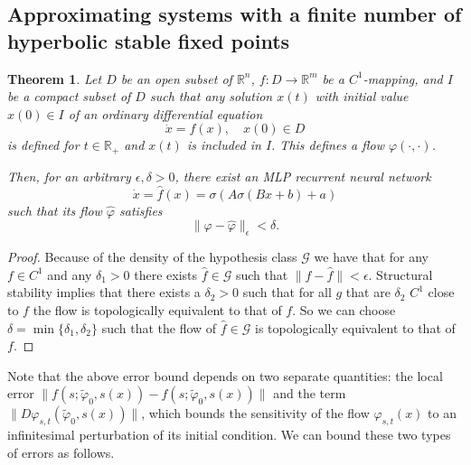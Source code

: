 \documentclass{article}
\newtheorem{theorem}{Theorem}
\theoremstyle{definition}
\theoremstyle{remark}
\newcommand{\reals}{\mathbb{R}}
\newcounter{ct}
\begin{document}
\subsection{Approximating systems with a finite number of hyperbolic stable fixed points}
\begin{theorem}
Let $D$ be an open subset of $\mathbb{R}^n$,
 $f\colon D \to \mathbb{R}^m$ be a $C^1$-mapping,
  and $I$ be a compact subset of $D$ such that any solution $x(t)$ with initial value $x(0) \in I$ of an ordinary differential equation
\begin{equation}\label{eq:5}
    \dot{x} = f(x), \quad x(0) \in D
\end{equation}
is defined for $t\in\reals_{+}$ and $x(t)$ is included in $I$.
This defines a flow $\varphi(\cdot, \cdot)$.


Then, for an arbitrary $\epsilon, \delta > 0$, there exist an MLP recurrent neural network 
 \begin{equation}
\dot x = \hat f(x) = \sigma(A\sigma(Bx+b)+a)
\end{equation}
such that its flow $\hat \varphi$ satisfies
\begin{equation}
\|\varphi-\hat \varphi\|_\epsilon < \delta.
\end{equation}
\end{theorem}


\begin{proof}%
Because of the density of the hypothesis class $\mathcal{G}$ we have that for any $f\in C^1$ and any $\delta_1>0$
there exists $\hat f\in\mathcal{G}$ such that $\|f-\hat f\|<\epsilon$.
%
Structural stability implies that there exists a $\delta_2>0$ such that for all $g$ that are $\delta_2$ $C^1$ close to $f$ the flow is topologically equivalent to that of $f$.
%
So we can choose $\delta = \min\{\delta_1,\delta_2\}$ such that the flow of $\hat f\in\mathcal{G}$ is topologically equivalent to that of $f$.
\end{proof}

Note that the above error bound depends on two separate quantities: the local error 
$\| f(s; \tilde{\varphi}_0, s(x)) - f(s; \tilde{\varphi}_0, s(x)) \|$ 
 and the term 
$\| D\varphi_{s,t}(\tilde{\varphi}_0, s(x)) \|$, 
which bounds the sensitivity of the flow $\varphi_{s,t}(x)$ to an infinitesimal perturbation of its initial condition.
We can bound these two types of errors as follows.%
\end{document}
